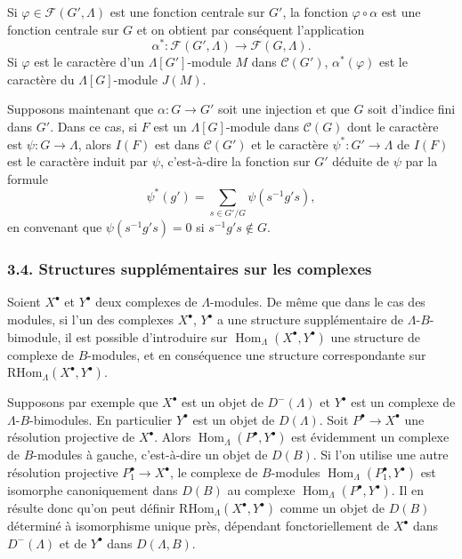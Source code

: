 \documentclass[11pt]{article}
\DeclareMathOperator{\Hom}{Hom}
\providecommand{\RHom}{\mathrm{RHom}}
\providecommand{\RHom}{\mathrm{RHom}}
\providecommand{\Hom}{\operatorname{Hom}}
\providecommand{\RHom}{\mathrm R\mathcal{H}om}
\begin{document}
Si $\varphi\in\mathcal F(G',\Lambda)$ est une fonction centrale sur $G'$, la fonction $\varphi\circ\alpha$ est une fonction centrale sur $G$ et on obtient par conséquent l'application
\[
\alpha^*: \mathcal F(G',\Lambda)\longrightarrow\mathcal F(G,\Lambda).
\]
Si $\varphi$ est le caractère d'un $\Lambda[G']$-module $M$ dans $\mathcal C(G')$, $\alpha^*(\varphi)$ est le caractère du $\Lambda[G]$-module $J(M)$.

Supposons maintenant que $\alpha:G\to G'$ soit une injection et que $G$ soit d'indice fini dans $G'$. Dans ce cas, si $F$ est un $\Lambda[G]$-module dans $\mathcal C(G)$ dont le caractère est $\psi:G\to\Lambda$, alors $I(F)$ est dans $\mathcal C(G')$ et le caractère $\psi^*:G'\to\Lambda$ de $I(F)$ est le caractère induit par $\psi$, c'est-à-dire la fonction sur $G'$ déduite de $\psi$ par la formule
\[
\psi^*(g')=\sum_{s\in G'/G}\psi(s^{-1}g's),
\tag{3.3.1}
\]
en convenant que $\psi(s^{-1}g's)=0$ si $s^{-1}g's\notin G$.

\subsubsection*{3.4. Structures supplémentaires sur les complexes}

Soient $X^\bullet$ et $Y^\bullet$ deux complexes de $\Lambda$-modules. De même que dans le cas des modules, si l'un des complexes $X^\bullet$, $Y^\bullet$ a une structure supplémentaire de $\Lambda$-$B$-bimodule, il est possible d'introduire sur $\Hom_{\Lambda}(X^\bullet,Y^\bullet)$ une structure de complexe de $B$-modules, et en conséquence une structure correspondante sur $\RHom_{\Lambda}(X^\bullet,Y^\bullet)$.

Supposons par exemple que $X^\bullet$ est un objet de $D^-(\Lambda)$ et $Y^\bullet$ est un complexe de $\Lambda$-$B$-bimodules. En particulier $Y^\bullet$ est un objet de $D(\Lambda)$. Soit $P^\bullet\to X^\bullet$ une résolution projective de $X^\bullet$. Alors $\Hom_{\Lambda}(P^\bullet,Y^\bullet)$ est évidemment un complexe de $B$-modules à gauche, c'est-à-dire un objet de $D(B)$. Si l'on utilise une autre résolution projective $P_1^\bullet\to X^\bullet$, le complexe de $B$-modules $\Hom_{\Lambda}(P_1^\bullet,Y^\bullet)$ est isomorphe canoniquement dans $D(B)$ au complexe $\Hom_{\Lambda}(P^\bullet,Y^\bullet)$. Il en résulte donc qu'on peut définir $\RHom_{\Lambda}(X^\bullet,Y^\bullet)$ comme un objet de $D(B)$ déterminé à isomorphisme unique près, dépendant fonctoriellement de $X^\bullet$ dans $D^-(\Lambda)$ et de $Y^\bullet$ dans $D(\Lambda,B)$.
\end{document}
